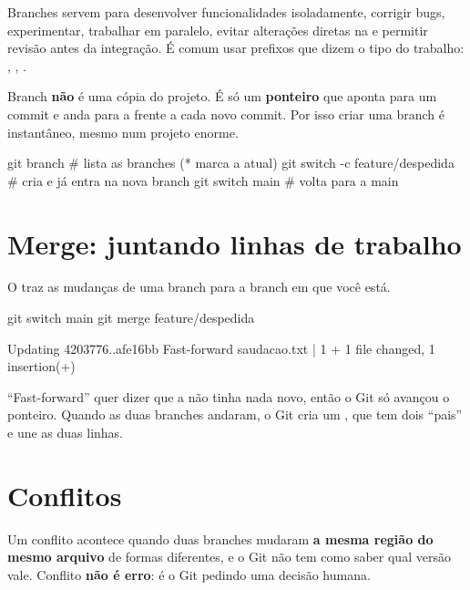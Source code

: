 Branches servem para desenvolver funcionalidades isoladamente, corrigir bugs, experimentar, trabalhar em paralelo, evitar alterações diretas na  e permitir revisão antes da integração. É comum usar prefixos que dizem o tipo do trabalho: , , .

\begin{atencao}
Branch \textbf{não} é uma cópia do projeto. É só um \textbf{ponteiro} que aponta para um commit e anda para a frente a cada novo commit. Por isso criar uma branch é instantâneo, mesmo num projeto enorme.
\end{atencao}

\begin{terminal}
git branch                        # lista as branches (* marca a atual)
git switch -c feature/despedida   # cria e já entra na nova branch
git switch main                   # volta para a main
\end{terminal}

\section{Merge: juntando linhas de trabalho}

O  traz as mudanças de uma branch para a branch em que você está.

\begin{terminal}
git switch main
git merge feature/despedida
\end{terminal}
\begin{saida}
Updating 4203776..afe16bb
Fast-forward
 saudacao.txt | 1 +
 1 file changed, 1 insertion(+)
\end{saida}

\enquote{Fast-forward} quer dizer que a  não tinha nada novo, então o Git só avançou o ponteiro. Quando as duas branches andaram, o Git cria um , que tem dois \enquote{pais} e une as duas linhas.

\section{Conflitos}
\label{sec:conflitos}

\begin{conceito}[Conflito]
Um conflito acontece quando duas branches mudaram \textbf{a mesma região do mesmo arquivo} de formas diferentes, e o Git não tem como saber qual versão vale. Conflito \textbf{não é erro}: é o Git pedindo uma decisão humana.
\end{conceito}

